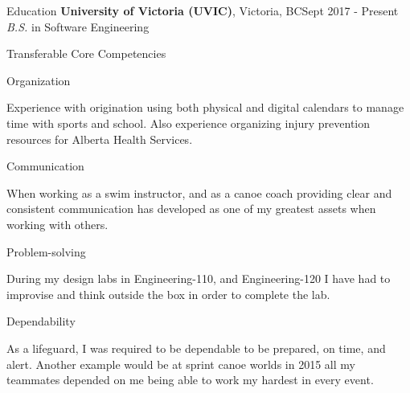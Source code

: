 \documentclass{resume}
\begin{document}
\begin{rSection}{Education}
	{\bf University of Victoria (UVIC)}, {Victoria, BC}\hfill {Sept 2017 - Present} \\
	{\em B.S.} {in Software Engineering}
\end{rSection}
\begin{rSection}{Transferable Core Competencies}

	\begin{rSubsection}{ Organization}{}{}{}
	\item Experience with origination using both physical and digital calendars to manage time with sports and school. Also experience organizing injury prevention resources for Alberta Health Services.
	\end{rSubsection}

	\begin{rSubsection}{ Communication}{}{}{}
	\item When working as a swim instructor, and as a canoe coach providing clear and consistent communication has developed as one of my greatest assets when working with others.
	\end{rSubsection}

	\begin{rSubsection}{ Problem-solving}{}{}{}
	\item During my design labs in Engineering-110, and Engineering-120 I have had to improvise and think outside the box in order to complete the lab.
	\end{rSubsection}

	\begin{rSubsection}{ Dependability}{}{}{}
	\item As a lifeguard, I was required to be dependable to be prepared, on time, and alert. Another example would be at sprint canoe worlds in 2015 all my teammates depended on me being able to work my hardest in every event.
	\end{rSubsection}

\end{rSection}
\end{document}
